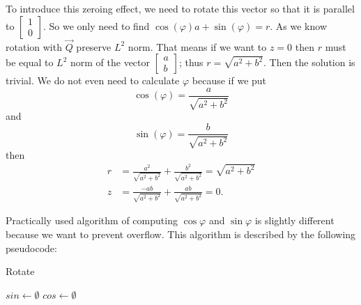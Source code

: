 To introduce this zeroing effect, we need to rotate this vector so that it is parallel to $
\begin{bmatrix} 
    1 \\
    0
\end{bmatrix}
$. So we only need to find  $\cos(\varphi) a + \sin(\varphi) = r $.
As we know rotation with $\vec{Q}$ preserve $L^2$ norm. That means if we want to $z = 0$  then $r$ must be equal to $L^2$ norm of the vector  
$
\begin{bmatrix} 
    a \\
    b
\end{bmatrix}
$;  thus $r = \sqrt{a^2 + b^2}$. 
Then the solution is trivial. We do not even need to calculate $\varphi$ because if we put
\begin{equation} \label{givens_cos}
    \cos(\varphi) = \frac{a}{\sqrt{a^2 + b^2}} 
\end{equation}
and   
\begin{equation} \label{givens_sin}
    \sin(\varphi) = \frac{b}{\sqrt{a^2 + b^2}} 
\end{equation}
then 
\begin{align}
    r &= \frac{a^2}{\sqrt{a^2 + b^2}} + \frac{b^2}{\sqrt{a^2 + b^2}} = \sqrt{a^2 + b^2} \\
    z &= \frac{-ab}{\sqrt{a^2 + b^2}} +  \frac{ab}{\sqrt{a^2 + b^2}} = 0.
\end{align}

Practically used algorithm of computing $\cos{\varphi}$ and  $\sin{\varphi}$ is slightly different because we want to prevent overflow. This algorithm is described by the following pseudocode:

\begin{algorithm}[H]
    \label{alg:givens}
    \caption{Rotate}
    $sin \gets \emptyset$\;
    $cos \gets \emptyset$\;
    \;
\end{algorithm}

